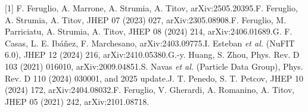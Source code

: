 \documentclass[10pt,a4paper]{article}
\begin{document}
\vspace{2pt}
{\footnotesize
[1] F. Feruglio, A. Marrone, A. Strumia, A. Titov, arXiv:2505.20395.\;
[2] F. Feruglio, A. Strumia, A. Titov, JHEP 07 (2023) 027, arXiv:2305.08908.\;
[3] F. Feruglio, M. Parriciatu, A. Strumia, A. Titov, JHEP 08 (2024) 214, arXiv:2406.01689.\;
[4] G. F. Casas, L. E. Ibáñez, F. Marchesano, arXiv:2403.09775.\;
[5] I. Esteban \emph{et al.} (NuFIT 6.0), JHEP 12 (2024) 216, arXiv:2410.05380.\;
[6] G.-y. Huang, S. Zhou, Phys. Rev. D 103 (2021) 016010, arXiv:2009.04851.\;
[7] S. Navas \emph{et al.} (Particle Data Group), Phys. Rev. D 110 (2024) 030001, and 2025 update.\;
[8] J. T. Penedo, S. T. Petcov, JHEP 10 (2024) 172, arXiv:2404.08032.\;
[9] F. Feruglio, V. Gherardi, A. Romanino, A. Titov, JHEP 05 (2021) 242, arXiv:2101.08718.\par}
\end{document}
